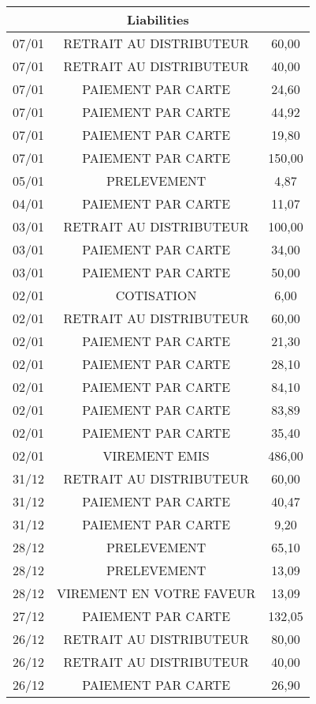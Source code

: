 \begin{longtable}{|c|c|c|}
\hline
\multicolumn{3}{|c|}{Liabilities} \\
\hline
07/01 & RETRAIT AU DISTRIBUTEUR & 60,00 \\
\hline
07/01 & RETRAIT AU DISTRIBUTEUR & 40,00 \\
\hline
07/01 & PAIEMENT PAR CARTE & 24,60 \\
\hline
07/01 & PAIEMENT PAR CARTE & 44,92 \\
\hline
07/01 & PAIEMENT PAR CARTE & 19,80 \\
\hline
07/01 & PAIEMENT PAR CARTE & 150,00 \\
\hline
05/01 & PRELEVEMENT & 4,87 \\
\hline
04/01 & PAIEMENT PAR CARTE & 11,07 \\
\hline
03/01 & RETRAIT AU DISTRIBUTEUR & 100,00 \\
\hline
03/01 & PAIEMENT PAR CARTE & 34,00 \\
\hline
03/01 & PAIEMENT PAR CARTE & 50,00 \\
\hline
02/01 & COTISATION & 6,00 \\
\hline
02/01 & RETRAIT AU DISTRIBUTEUR & 60,00 \\
\hline
02/01 & PAIEMENT PAR CARTE & 21,30 \\
\hline
02/01 & PAIEMENT PAR CARTE & 28,10 \\
\hline
02/01 & PAIEMENT PAR CARTE & 84,10 \\
\hline
02/01 & PAIEMENT PAR CARTE & 83,89 \\
\hline
02/01 & PAIEMENT PAR CARTE & 35,40 \\
\hline
02/01 & VIREMENT EMIS & 486,00 \\
\hline
31/12 & RETRAIT AU DISTRIBUTEUR & 60,00 \\
\hline
31/12 & PAIEMENT PAR CARTE & 40,47 \\
\hline
31/12 & PAIEMENT PAR CARTE & 9,20 \\
\hline
28/12 & PRELEVEMENT & 65,10 \\
\hline
28/12 & PRELEVEMENT & 13,09 \\
\hline
28/12 & VIREMENT EN VOTRE FAVEUR & 13,09 \\
\hline
27/12 & PAIEMENT PAR CARTE & 132,05 \\
\hline
26/12 & RETRAIT AU DISTRIBUTEUR & 80,00 \\
\hline
26/12 & RETRAIT AU DISTRIBUTEUR & 40,00 \\
\hline
26/12 & PAIEMENT PAR CARTE & 26,90 \\

\end{longtable}
